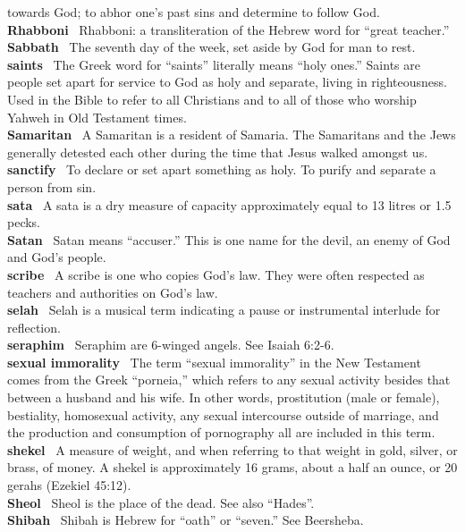 towards God; to abhor one's past sins and determine to follow God.\\
\textbf{Rhabboni}~ Rhabboni: a transliteration of the Hebrew word for
``great teacher.''\\
\textbf{Sabbath}~ The seventh day of the week, set aside by God for man
to rest.\\
\textbf{saints}~ The Greek word for ``saints'' literally means ``holy
ones.'' Saints are people set apart for service to God as holy and
separate, living in righteousness. Used in the Bible to refer to all
Christians and to all of those who worship Yahweh in Old Testament
times.\\
\textbf{Samaritan}~ A Samaritan is a resident of Samaria. The Samaritans
and the Jews generally detested each other during the time that Jesus
walked amongst us.\\
\textbf{sanctify}~ To declare or set apart something as holy. To purify
and separate a person from sin.\\
\textbf{sata}~ A sata is a dry measure of capacity approximately equal
to 13 litres or 1.5 pecks.\\
\textbf{Satan}~ Satan means ``accuser.'' This is one name for the devil,
an enemy of God and God's people.\\
\textbf{scribe}~ A scribe is one who copies God's law. They were often
respected as teachers and authorities on God's law.\\
\textbf{selah}~ Selah is a musical term indicating a pause or
instrumental interlude for reflection.\\
\textbf{seraphim}~ Seraphim are 6-winged angels. See Isaiah 6:2-6.\\
\textbf{sexual immorality}~ The term ``sexual immorality'' in the New
Testament comes from the Greek ``porneia,'' which refers to any sexual
activity besides that between a husband and his wife. In other words,
prostitution (male or female), bestiality, homosexual activity, any
sexual intercourse outside of marriage, and the production and
consumption of pornography all are included in this term.\\
\textbf{shekel}~ A measure of weight, and when referring to that weight
in gold, silver, or brass, of money. A shekel is approximately 16 grams,
about a half an ounce, or 20 gerahs (Ezekiel 45:12).\\
\textbf{Sheol}~ Sheol is the place of the dead. See also ``Hades''.\\
\textbf{Shibah}~ Shibah is Hebrew for ``oath'' or ``seven.'' See
Beersheba.\\
